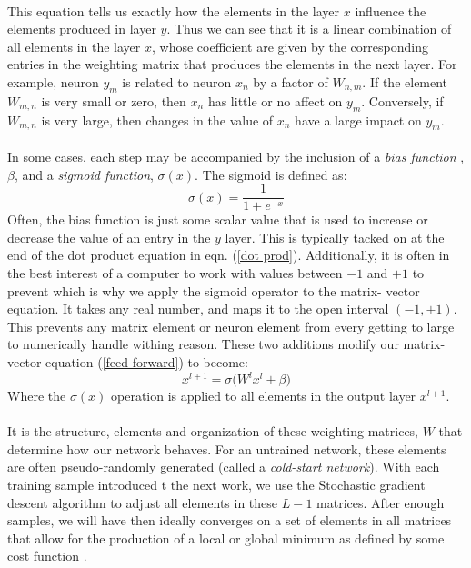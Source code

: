 \documentclass[12pt,letterpaper]{article}
\begin{document}
\paragraph*{}This equation tells us exactly how the elements in the layer $x$ influence the elements produced in layer $y$. Thus we can see that it is a linear combination of all elements in the layer $x$, whose coefficient are given by the corresponding entries in the weighting matrix that produces the elements in the next layer. For example, neuron $y_m$ is related to neuron $x_n$ by a factor of $W_{n,m}$. If the element $W_{m,n}$ is very small or zero, then $x_n$ has little or no affect on $y_m$. Conversely, if $W_{m,n}$ is very large, then changes in the value of $x_n$ have a large impact on $y_m$.
\paragraph*{}In some cases, each step may be accompanied by the inclusion of a \textit{bias function} , $\beta$, and a \textit{sigmoid function}, $\sigma(x)$. The sigmoid is defined as:
\begin{equation}
\label{sigmoid}
\sigma(x) = \frac{1}{1+e^{-x}}
\end{equation}
Often, the bias function is just some scalar value that is used to increase or decrease the value of an entry in the $y$ layer. This is typically tacked on at the end of the dot product equation in eqn. (\ref{dot prod}). Additionally, it is often in the best interest of a computer to work with values between $-1$ and $+1$ to prevent which is why we apply the sigmoid operator to the matrix- vector equation. It takes any real number, and maps it to the open interval $(-1,+1)$. This prevents any matrix element or neuron element from every getting to large to numerically handle withing reason. These two additions modify our matrix- vector equation (\ref{feed forward}) to become:
\begin{equation}
\label{mod feed forward}
x^{l+1} = \sigma \big( W^l x^l + \beta \big)
\end{equation}
Where the $\sigma(x)$ operation is applied to all elements in the output layer $x^{l+1}$.
\paragraph*{}It is the structure, elements and organization of these weighting matrices, $W$ that determine how our network behaves. For an untrained network, these elements are often pseudo-randomly generated (called a \textit{cold-start network}\cite{Geron}). With each training sample introduced t the next work, we use the Stochastic gradient descent algorithm to adjust all elements in these $L-1$ matrices. After enough samples, we will have then ideally converges on a set of elements in all matrices that allow for the production of a local or global minimum as defined by some cost function \cite{Goodfellow}. 
\end{document}
